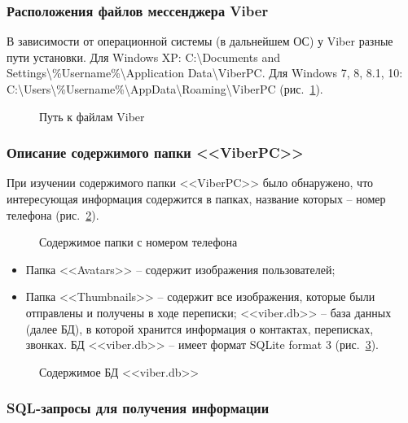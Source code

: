 \subsubsection{Расположения файлов мессенджера Viber}
 
В зависимости от операционной системы (в дальнейшем ОС) у Viber разные пути установки. Для Windows XP: C:\textbackslash Documents and Settings\textbackslash \%Username\%\textbackslash Application Data\textbackslash ViberPC.
Для Windows 7, 8, 8.1, 10: C:\textbackslash Users\textbackslash \%Username\%\textbackslash AppData\textbackslash Roaming\textbackslash ViberPC (рис.~\ref{kucher_1:kucher_1}).
 
\begin{figure}[h!]
\caption{ Путь к файлам Viber }
\label{kucher_1:kucher_1}
\end{figure}

\subsubsection{Описание содержимого папки <<ViberPC>>}

При изучении содержимого папки <<ViberPC>> было обнаружено, что интересующая информация содержится в папках, название которых – номер телефона (рис.~\ref{kucher_2:kucher_2}).
	

\begin{figure}[h!]
\caption{ Содержимое папки с номером телефона }
\label{kucher_2:kucher_2}
\end{figure} 

\begin{itemize}
  \item Папка <<Avatars>> – содержит изображения пользователей;
  \item Папка <<Thumbnails>> – содержит все изображения, которые были отправлены и получены в ходе переписки;
	<<viber.db>> – база данных (далее БД), в которой хранится информация о контактах, переписках, звонках.
	БД <<viber.db>> – имеет формат SQLite format 3 (рис.~\ref{kucher_3:kucher_3}).
\end{itemize}
 
\begin{figure}[h!]
\caption{ Содержимое БД <<viber.db>> }
\label{kucher_3:kucher_3}
\end{figure} 

\subsubsection{SQL-запросы для получения информации}

